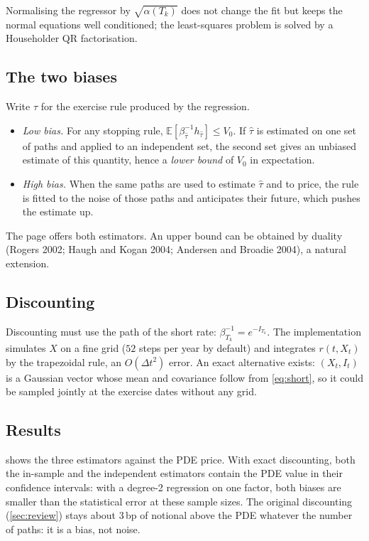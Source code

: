 \documentclass[11pt,a4paper]{article}
\theoremstyle{definition}
\theoremstyle{remark}
\newcommand{\E}{\mathbb{E}}
\begin{document}
Normalising the regressor by $\sqrt{\alpha(T_k)}$ does not change the fit but keeps the normal equations well conditioned;
the least-squares problem is solved by a Householder QR factorisation.

\subsection{The two biases}
Write $\hat\tau$ for the exercise rule produced by the regression.
\begin{itemize}[nosep]
  \item \emph{Low bias.} For any stopping rule, $\E[\beta_{\hat\tau}^{-1}h_{\hat\tau}]\le V_0$. If $\hat\tau$ is estimated on
        one set of paths and applied to an independent set, the second set gives an unbiased estimate of this quantity, hence a
        \emph{lower bound} of $V_0$ in expectation.
  \item \emph{High bias.} When the same paths are used to estimate $\hat\tau$ and to price, the rule is fitted to the noise of
        those paths and anticipates their future, which pushes the estimate up.
\end{itemize}
The page offers both estimators. An upper bound can be obtained by duality (Rogers 2002; Haugh and Kogan 2004; Andersen and
Broadie 2004), a natural extension.

\subsection{Discounting}
Discounting must use the path of the short rate: $\beta_{T_k}^{-1}=e^{-I_{T_k}}$. The implementation simulates $X$ on a fine
grid ($52$ steps per year by default) and integrates $r(t,X_t)$ by the trapezoidal rule, an $O(\Delta t^2)$ error. An exact
alternative exists: $(X_t,I_t)$ is a Gaussian vector whose mean and covariance follow from \eqref{eq:short}, so it could be
sampled jointly at the exercise dates without any grid.

\subsection{Results}
 shows the three estimators against the PDE price. With exact discounting, both the in-sample and the
independent estimators contain the PDE value in their confidence intervals: with a degree-2 regression on one factor, both
biases are smaller than the statistical error at these sample sizes. The original discounting (\cref{sec:review}) stays
about $3$\,bp of notional above the PDE whatever the number of paths: it is a bias, not noise.
\end{document}
